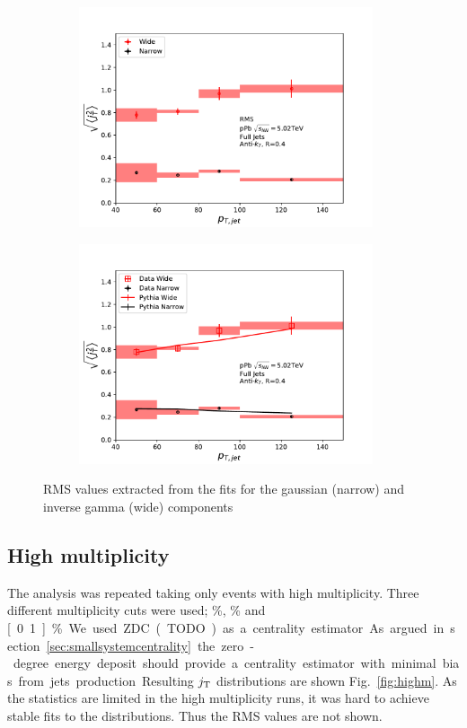 \begin{figure}[htb]
\begin{subfigure}{0.5\textwidth}
\includegraphics[width=0.95\textwidth]{results/RMSWithSystematics}
\end{subfigure}
\begin{subfigure}{0.5\textwidth}
\includegraphics[width=0.95\textwidth]{results/RMSWithSystematics_Pythia}
\end{subfigure}
\caption{RMS values extracted from the fits for the gaussian (narrow) and inverse gamma (wide) components}
\label{fig:rms}
\end{figure}

\subsection{High multiplicity}
The analysis was repeated taking only events with high multiplicity. Three different multiplicity cuts were used; \unit[10]{\%}, \unit[1]{\%} and \unit[0.1]{\%}. We used ZDC(TODO) as a centrality estimator. As argued in section ~\ref{sec:smallsystemcentrality} the zero-degree energy deposit should provide a centrality estimator with minimal bias from jets production. Resulting $j_{\rm T}$ distributions are shown Fig.~\ref{fig:highm}. As the statistics are limited in the high multiplicity runs, it was hard to achieve stable fits to the distributions. Thus the RMS values are not shown.


